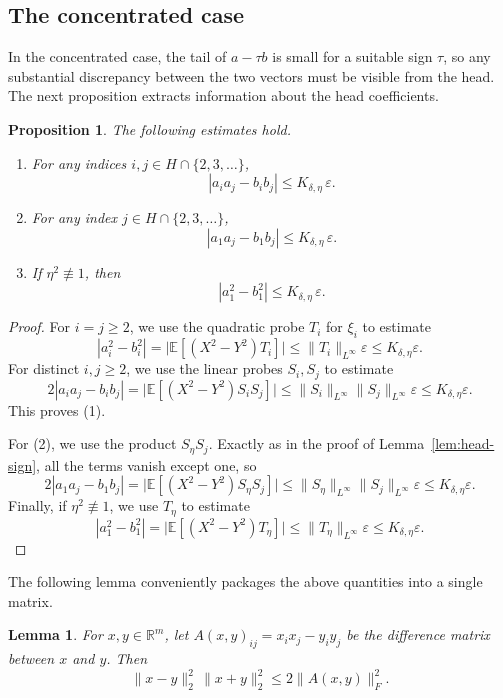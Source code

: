 \documentclass[11pt]{amsart}
\numberwithin{equation}{section}
\newtheorem{proposition}[theorem]{Proposition}
\newtheorem{lemma}[theorem]{Lemma}
\theoremstyle{definition}
\theoremstyle{remark}
\newcommand{\E}{\mathbb E}
\newcommand{\R}{\mathbb R}
\newcommand{\eps}{\varepsilon}
\newcommand{\norm}[1]{\lVert #1 \rVert}
\begin{document}
\subsection{The concentrated case}
In the concentrated case, the tail of
$a-\tau b$ is small for a suitable sign $\tau$, so any substantial discrepancy
between the two vectors must be visible from the head.  The next proposition
extracts information about the
head coefficients.

\begin{proposition}
\label{prop:head-entry}
The following estimates hold.
\begin{enumerate}[label=\rm(\arabic*)]
\item For any indices $i,j\in H\cap\{2,3,\dots\}$,
\[
|a_i a_j-b_i b_j|\le K_{\delta,\eta}\,\eps.
\]
\item For any index $j\in H\cap\{2,3,\dots\}$,
\[
|a_1a_j-b_1b_j|\le K_{\delta,\eta}\,\eps.
\]
\item If $\eta^2\not\equiv1$, then
\[
|a_1^2-b_1^2|\le K_{\delta,\eta}\,\eps.
\]
\end{enumerate}
\end{proposition}

\begin{proof}
For $i=j\ge2$, we use the quadratic probe $T_i$ for $\xi_i$ to estimate
\[
|a_i^2-b_i^2|
=\bigl|\E[(X^2-Y^2)T_i]\bigr|
\le \norm{T_i}_{L^\infty}\eps
\le K_{\delta,\eta}\eps.
\]
For distinct $i,j\ge2$, we use the linear probes $S_i,S_j$ to estimate
\[
2|a_i a_j-b_i b_j|
=\bigl|\E[(X^2-Y^2)S_iS_j]\bigr|
\le \norm{S_i}_{L^\infty}\norm{S_j}_{L^\infty}\eps
\le K_{\delta,\eta}\eps.
\]
This proves \rm(1).

For \rm(2), we use the product $S_\eta S_j$.  Exactly as in the proof of
Lemma~\ref{lem:head-sign}, all the terms vanish except one, so
\[
2|a_1a_j-b_1b_j|
=\bigl|\E[(X^2-Y^2)S_\eta S_j]\bigr|
\le \norm{S_\eta}_{L^\infty}\norm{S_j}_{L^\infty}\eps
\le K_{\delta,\eta}\eps.
\]
Finally, if $\eta^2\not\equiv1$, we use $T_\eta$ to estimate
\[
|a_1^2-b_1^2|
=\bigl|\E[(X^2-Y^2)T_\eta]\bigr|
\le \norm{T_\eta}_{L^\infty}\eps
\le K_{\delta,\eta}\eps.
\]
\end{proof}

The following lemma conveniently packages the above quantities into a single matrix.
\begin{lemma}\label{lem:rank-one}
For $x,y\in\R^m$, let $A(x,y)_{ij}=x_ix_j-y_iy_j$ be the difference matrix between $x$ and $y$. Then
\[
\norm{x-y}_2^2\,\norm{x+y}_2^2\le 2\norm{A(x,y)}_F^2.
\]
\end{lemma}
\end{document}
